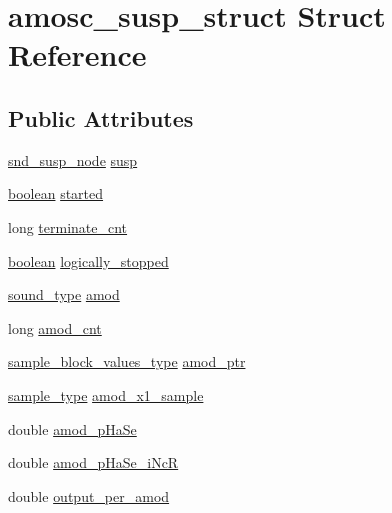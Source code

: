\hypertarget{structamosc__susp__struct}{}\section{amosc\+\_\+susp\+\_\+struct Struct Reference}
\label{structamosc__susp__struct}
\subsection*{Public Attributes}
\begin{DoxyCompactItemize}
\item 
\hyperlink{sound_8h_a6b268203688a934bd798ceb55f85d4c0}{snd\+\_\+susp\+\_\+node} \hyperlink{structamosc__susp__struct_af4e3de20661233648de12882d47ad426}{susp}
\item 
\hyperlink{cext_8h_a7670a4e8a07d9ebb00411948b0bbf86d}{boolean} \hyperlink{structamosc__susp__struct_a4f1d48f0cc20264f3e1303341d28db6e}{started}
\item 
long \hyperlink{structamosc__susp__struct_a17e669db1994d4f58a6cdd3e7ec9d4fa}{terminate\+\_\+cnt}
\item 
\hyperlink{cext_8h_a7670a4e8a07d9ebb00411948b0bbf86d}{boolean} \hyperlink{structamosc__susp__struct_a54009805e83cb1edce8dadd48de166e5}{logically\+\_\+stopped}
\item 
\hyperlink{sound_8h_a792cec4ed9d6d636d342d9365ba265ea}{sound\+\_\+type} \hyperlink{structamosc__susp__struct_ad59c4900abd378adfee078e9b9da733e}{amod}
\item 
long \hyperlink{structamosc__susp__struct_a6ebfab5d7cb287783e4c08b42b437c99}{amod\+\_\+cnt}
\item 
\hyperlink{sound_8h_a83d17f7b465d1591f27cd28fc5eb8a03}{sample\+\_\+block\+\_\+values\+\_\+type} \hyperlink{structamosc__susp__struct_a5d95c0dec564bbb99265798070e76374}{amod\+\_\+ptr}
\item 
\hyperlink{sound_8h_a3a9d1d4a1c153390d2401a6e9f71b32c}{sample\+\_\+type} \hyperlink{structamosc__susp__struct_ae0be4c3a135b2bb78602586439a3aa0f}{amod\+\_\+x1\+\_\+sample}
\item 
double \hyperlink{structamosc__susp__struct_a0143b71974c5e0a062821d04bc9677bd}{amod\+\_\+p\+Ha\+Se}
\item 
double \hyperlink{structamosc__susp__struct_a244e4c8a4c0612250e8f3f1cafb8e053}{amod\+\_\+p\+Ha\+Se\+\_\+i\+NcR}
\item 
double \hyperlink{structamosc__susp__struct_a660aa2f2407f2ccb69998e2abc194ac1}{output\+\_\+per\+\_\+amod}

\end{DoxyCompactItemize}
